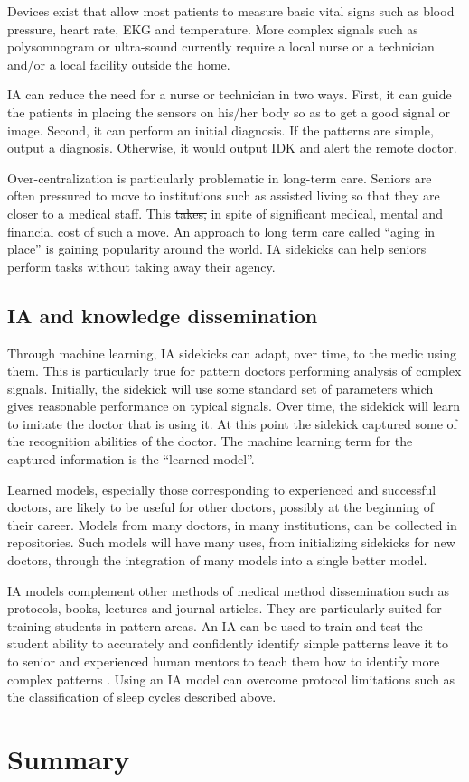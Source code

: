 \documentclass[11pt]{pnas-new}
\begin{document}
Devices exist that allow most patients to measure basic vital signs
such as blood pressure, heart rate, {\color{blue}EKG}   and temperature. More complex signals such as
polysomnogram or ultra-sound currently require a local nurse or a
technician and/or a local facility outside the home.

IA can reduce the need for a nurse or technician in two ways. First,
it can guide the patients in placing the sensors on his/her
body so as to get a good signal or image. Second, it can perform an
initial diagnosis. If the patterns are simple, output a diagnosis.
Otherwise, it would output IDK and alert the remote doctor.

Over-centralization is particularly problematic in long-term care.
Seniors are often pressured to move to institutions such as
assisted living so that they are closer to a medical staff. This \sout{\color{blue}takes,} in
spite of significant medical, mental and financial cost of such a
move. An approach to long term care called ``aging in
place'' is gaining popularity around the world. IA sidekicks can help
seniors perform tasks without taking away their agency.


\subsection{IA and knowledge dissemination}

Through machine learning, IA sidekicks can adapt, over time, to the
medic using them. This is particularly true for pattern doctors
performing analysis of complex signals. Initially, the sidekick will
use some standard set of parameters which gives reasonable performance on
typical signals. Over time, the sidekick will learn to imitate the
doctor that is using it. At this point the sidekick captured some of
the recognition abilities of the doctor. The machine learning term for
the captured information is the ``learned model''.

Learned models, especially those corresponding to experienced and
successful doctors, are likely to be useful for other doctors,
possibly at the beginning of their career. Models from many doctors,
in many institutions, can be collected in repositories. Such models
will have many uses, from initializing sidekicks for new doctors,
through the integration of many models into a single better model.

IA models complement other methods of medical method dissemination
such as protocols, books, lectures and journal articles. They are
particularly suited for training students in pattern areas. An IA can
be used to train and test the student ability to accurately and
confidently identify simple patterns leave it to to senior and
experienced human mentors to teach them how to identify more complex
patterns \cite{reid2000medical}.
Using an IA model can overcome protocol limitations such as
the classification of sleep cycles described above.

\section{Summary}


% 

\end{document}
